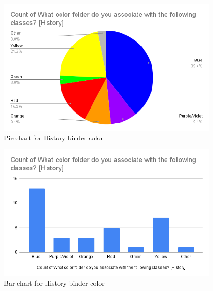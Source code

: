 \documentclass[12pt]{article}
\begin{document}
\begin{figure}
  \includegraphics[width=\linewidth]{images/history-binder-color-pie.png}
  \caption{Pie chart for History binder color}
  \label{fig:binder-color-pie}
\end{figure}

\begin{figure}
  \includegraphics[width=\linewidth]{images/history-binder-color-bar.png}
  \caption{Bar chart for History binder color}
  \label{fig:binder-color-bar}
\end{figure}
\end{document}
